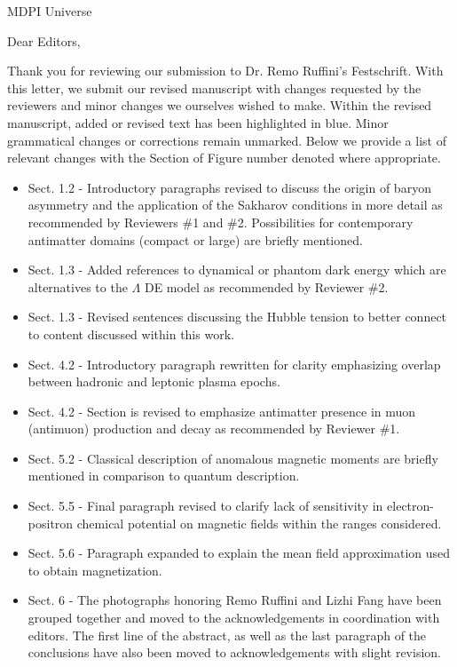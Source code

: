 \documentclass[a4paper, 10pt]{letter}
\begin{document}
\begin{letter}{MDPI Universe}

\opening{Dear Editors,}

Thank you for reviewing our submission to Dr. Remo Ruffini's Festschrift. With this letter, we submit our revised manuscript with changes requested by the reviewers and minor changes we ourselves wished to make. Within the revised manuscript, added or revised text has been highlighted in blue. Minor grammatical changes or corrections remain unmarked. Below we provide a list of relevant changes with the Section of Figure number denoted where appropriate.

\begin{itemize}
    \item Sect. 1.2 - Introductory paragraphs revised to discuss the origin of baryon asymmetry and the application of the Sakharov conditions in more detail as recommended by Reviewers \#1 and \#2. Possibilities for contemporary antimatter domains (compact or large) are briefly mentioned.
    \item Sect. 1.3 - Added references to dynamical or phantom dark energy which are alternatives to the $\Lambda$ DE model as recommended by Reviewer \#2.
    \item Sect. 1.3 - Revised sentences discussing the Hubble tension to better connect to content discussed within this work.
    \item Sect. 4.2 - Introductory paragraph rewritten for clarity emphasizing overlap between hadronic and leptonic plasma epochs.
    \item Sect. 4.2 - Section is revised to emphasize antimatter presence in muon (antimuon) production and decay as recommended by Reviewer \#1.
    \item Sect. 5.2 - Classical description of anomalous magnetic moments are briefly mentioned in comparison to quantum description.
    \item Sect. 5.5 - Final paragraph revised to clarify lack of sensitivity in electron-positron chemical potential on magnetic fields within the ranges considered.
    \item Sect. 5.6 - Paragraph expanded to explain the mean field approximation used to obtain magnetization.
    \item Sect. 6 - The photographs honoring Remo Ruffini and Lizhi Fang have been grouped together and moved to the acknowledgements in coordination with editors. The first line of the abstract, as well as the last paragraph of the conclusions have also been moved to acknowledgements with slight revision.
\end{itemize}


\end{letter}
\end{document}
